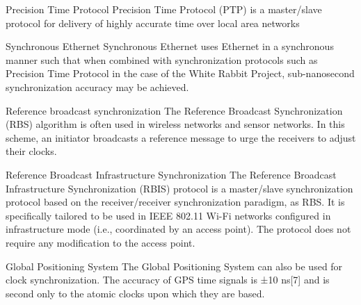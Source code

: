Precision Time Protocol
Precision Time Protocol (PTP) is a master/slave protocol for delivery of highly
accurate time over local area networks

Synchronous Ethernet
Synchronous Ethernet uses Ethernet in a synchronous manner such that when
combined with synchronization protocols such as Precision Time Protocol in the
case of the White Rabbit Project, sub-nanosecond synchronization accuracy may be
achieved.

Reference broadcast synchronization
The Reference Broadcast Synchronization (RBS) algorithm is often used in
wireless networks and sensor networks. In this scheme, an initiator broadcasts a
reference message to urge the receivers to adjust their clocks.

Reference Broadcast Infrastructure Synchronization
The Reference Broadcast Infrastructure Synchronization (RBIS) protocol is a
master/slave synchronization protocol based on the receiver/receiver
synchronization paradigm, as RBS. It is specifically tailored to be used in IEEE
802.11 Wi-Fi networks configured in infrastructure mode (i.e., coordinated by an
access point). The protocol does not require any modification to the access point.

Global Positioning System
The Global Positioning System can also be used for clock synchronization. The
accuracy of GPS time signals is ±10 ns[7] and is second only to the atomic
clocks upon which they are based.
